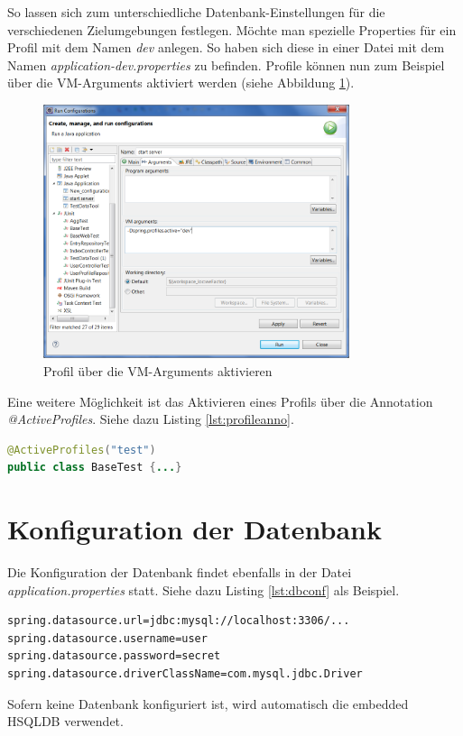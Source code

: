 So lassen sich zum unterschiedliche Datenbank-Einstellungen für die verschiedenen Zielumgebungen festlegen. Möchte man spezielle Properties für ein Profil mit dem Namen \emph{dev} anlegen. So haben sich diese in einer Datei mit dem Namen \emph{application-dev.properties} zu befinden. Profile können nun zum Beispiel über die VM-Arguments aktiviert werden (siehe Abbildung \ref{fig:active-profile}).
\begin{figure}[H]
    \centering
    \includegraphics[width=0.8\textwidth]{Bilder/startlauncher.png}
    \caption{Profil über die VM-Arguments aktivieren}
    \label{fig:active-profile}
\end{figure}

Eine weitere Möglichkeit ist das Aktivieren eines Profils über die Annotation \emph{@ActiveProfiles}. Siehe dazu Listing \ref{lst:profileanno}.

   \begin{lstlisting}[caption={@ActiveProfiles Annotation},label={lst:profileanno},language=Java]
@ActiveProfiles("test")
public class BaseTest {...}
   \end{lstlisting}

\section{Konfiguration der Datenbank}\label{s_config_db}
Die Konfiguration der Datenbank findet ebenfalls in der Datei \emph{application.properties} statt. Siehe dazu Listing \ref{lst:dbconf} als Beispiel.
   \begin{lstlisting}[caption={Konfiguration der Datenbank},label={lst:dbconf}]
spring.datasource.url=jdbc:mysql://localhost:3306/...
spring.datasource.username=user
spring.datasource.password=secret
spring.datasource.driverClassName=com.mysql.jdbc.Driver
   \end{lstlisting}
   Sofern keine Datenbank konfiguriert ist, wird automatisch die embedded HSQLDB verwendet.



